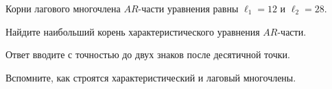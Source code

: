
\begin{question}
Корни лагового многочлена \(AR\)-части уравнения равны \(\ell_1 = 12\) и \(\ell_2 = 28\).

Найдите наибольший корень характеристического уравнения \(AR\)-части.

Ответ вводите с точностью до двух знаков после десятичной точки.
\end{question}

\begin{solution}
Вспомните, как строятся характеристический и лаговый многочлены.
\end{solution}

